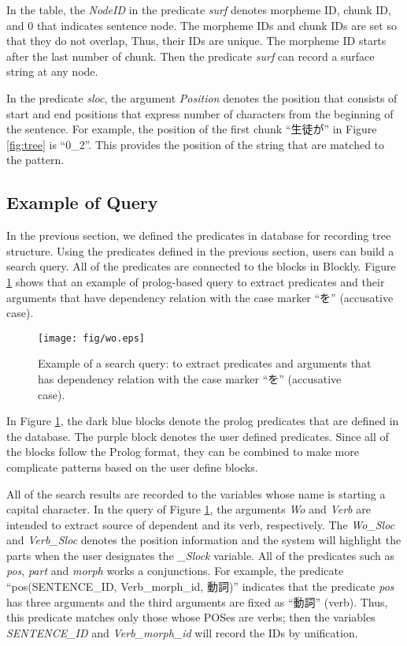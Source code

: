 \documentclass[conference]{IEEEtran}
\begin{document}
In the table, the {\it NodeID} in the predicate {\it surf} denotes
morpheme ID, chunk ID, and 0 that indicates sentence node.
The morpheme IDs and chunk IDs are set so that they do not overlap,
Thus, their IDs are unique. The morpheme ID starts after the last number
of chunk. Then the predicate {\it surf} can
record a surface string at any node.

In the predicate {\it sloc}, the argument {\it Position} denotes
the position that consists of start and end positions that express number of characters
from the beginning of the sentence.
For example, the position of the first chunk ``生徒が'' in Figure \ref{fig:tree}
is ``0\_2''. This provides the position of the string that are matched to the pattern.



\subsection{Example of Query}
\label{sec:example}
In the previous section, we defined the predicates in database for recording tree structure.
Using the predicates defined in the previous section,
users can build a search query. All of the predicates are connected to the blocks
in Blockly. Figure \ref{fig:pattern} shows that an example of prolog-based query to extract predicates and their arguments that have dependency relation with the case marker ``を'' (accusative case).

\begin{figure}[htbp]
\centerline{\texttt{[image: fig/wo.eps]}}
\caption{Example of a search query: to extract predicates and arguments that has dependency relation with the case marker ``を'' (accusative case).}
\label{fig:pattern}
\end{figure}

In Figure \ref{fig:pattern}, the dark blue blocks denote the prolog predicates that are defined
in the database. The purple block denotes the user defined predicates. Since all of the blocks
follow the Prolog format, they can be combined to make more complicate patterns based on the user define blocks.

All of the search results are recorded to the variables whose name is starting a capital character.
In the query of Figure \ref{fig:pattern}, the arguments {\it Wo} and {\it Verb} are intended
to extract source of dependent and its verb, respectively.
The {\it Wo\_Sloc} and {\it Verb\_Sloc} denotes the position information and the system
will highlight the parts when the user designates the {\it \_Slock} variable.
All of the predicates such as {\it pos}, {\it part} and {\it morph} works a conjunctions.
For example, the predicate ``pos(SENTENCE\_ID, Verb\_morph\_id, 動詞)'' indicates that
the predicate {\it pos} has three arguments and the third arguments are fixed as ``動詞'' (verb).
Thus, this predicate matches only those whose POSes are verbs; then the variables
  {\it SENTENCE\_ID} and {\it Verb\_morph\_id} will record the IDs by unification.
\end{document}
